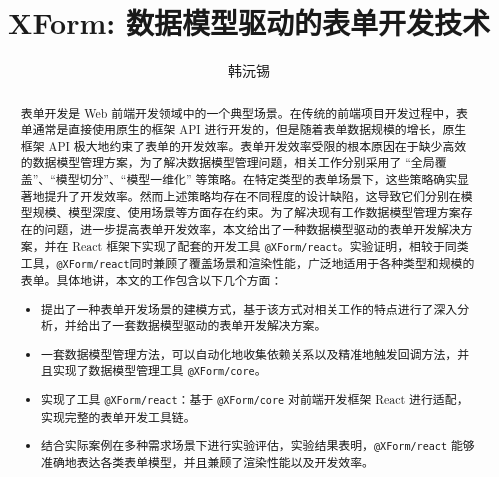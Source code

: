 \documentclass[winfonts,master,twoside]{njuthesis}
\title{XForm: 数据模型驱动的表单开发技术}
\author{韩沅锡}
\institute{南京大学}
\makeatletter
\newcommand{\xform}[1]{\texttt{@XForm/#1}}
\makeatother
\begin{document}

\maketitle
\makeenglishtitle


\frontmatter

\begin{abstract}
    表单开发是 Web 前端开发领域中的一个典型场景。在传统的前端项目开发过程中，表单通常是直接使用原生的框架 API 进行开发的，但是随着表单数据规模的增长，原生框架 API 极大地约束了表单的开发效率。表单开发效率受限的根本原因在于缺少高效的数据模型管理方案，为了解决数据模型管理问题，相关工作分别采用了 “全局覆盖”、“模型切分”、“模型一维化” 等策略。在特定类型的表单场景下，这些策略确实显著地提升了开发效率。然而上述策略均存在不同程度的设计缺陷，这导致它们分别在模型规模、模型深度、使用场景等方面存在约束。为了解决现有工作数据模型管理方案存在的问题，进一步提高表单开发效率，本文给出了一种数据模型驱动的表单开发解决方案，并在 React 框架下实现了配套的开发工具 \xform{react}。实验证明，相较于同类工具，\xform{react}同时兼顾了覆盖场景和渲染性能，广泛地适用于各种类型和规模的表单。具体地讲，本文的工作包含以下几个方面：

    \begin{itemize}
        \item 提出了一种表单开发场景的建模方式，基于该方式对相关工作的特点进行了深入分析，并给出了一套数据模型驱动的表单开发解决方案。
        \item 一套数据模型管理方法，可以自动化地收集依赖关系以及精准地触发回调方法，并且实现了数据模型管理工具 \xform{core}。
        \item 实现了工具 \xform{react}：基于 \xform{core} 对前端开发框架 React 进行适配，实现完整的表单开发工具链。
        \item 结合实际案例在多种需求场景下进行实验评估，实验结果表明，\xform{react} 能够准确地表达各类表单模型，并且兼顾了渲染性能以及开发效率。
    \end{itemize}

\end{abstract}
\end{document}
